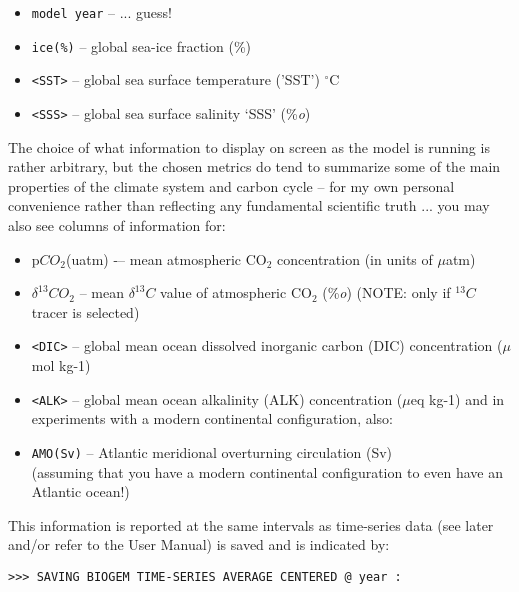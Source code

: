 \vspace{1mm}
\begin{itemize}
\item[] \texttt{model year}  -- ... guess!
\item[] \texttt{ice(\%)} -- global sea-ice fraction (\%)
\item[] \texttt{<SST>} -- global sea surface temperature ('SST') $^{\circ}$C
\item[] \texttt{<SSS>} -- global sea surface salinity ‘SSS’ (\%\textit{o})
\end{itemize}
\vspace{1mm}

The choice of what information to display on screen as the model is running is rather arbitrary, but the chosen metrics do tend to summarize some of the main properties of the climate system and carbon cycle – for my own personal convenience rather than reflecting any fundamental scientific truth ... you may also see columns of information for:

\vspace{1mm}
\begin{itemize}
\item[] p\(CO_{2}\)(uatm) -– mean atmospheric CO\(_{2}\) concentration (in units of \(\mu\)atm)
\item[] \(\delta^{13}CO_{2}\)  – mean \(\delta^{13}C\) value of atmospheric CO\(_{2}\) (\%\textit{o}) (NOTE: only if \(^{13}C\) tracer is selected)
\item[] \texttt{<DIC>} -- global mean ocean dissolved inorganic carbon (DIC) concentration (\(\mu\)mol kg-1)
\item[] \texttt{<ALK>}   – global mean ocean alkalinity (ALK) concentration (\(\mu\)eq kg-1) and in experiments with a modern continental configuration, also:
\item[] \texttt{AMO(Sv)} -- Atlantic meridional overturning circulation (Sv)
\\(assuming that you have a modern continental configuration to even have an Atlantic ocean!)
\end{itemize}
\vspace{1mm}

This information is reported at the same intervals as time-series data (see later and/or refer to the User Manual) is saved and is indicated by:

\vspace{-2mm}
\begin{verbatim}
>>> SAVING BIOGEM TIME-SERIES AVERAGE CENTERED @ year :
\end{verbatim}
\vspace{-2mm}


